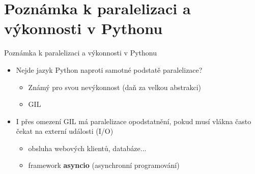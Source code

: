 \documentclass{beamer}
\begin{document}
\section{Poznámka k paralelizaci a výkonnosti v Pythonu}
\begin{frame}{Poznámka k paralelizaci a výkonnosti v Pythonu}
	\begin{itemize}
    \item Nejde jazyk Python naproti samotné podstatě paralelizace?
    \begin{itemize}
      \item [\textendash] Známý pro svou nevýkonnost (daň za velkou abstrakci)      
      \item [\textendash] GIL
    \end{itemize}

    \item I přes omezení GIL má paralelizace opodstatnění, pokud musí vlákna často čekat na externí události (I/O)
    \begin{itemize}
      \item [\textendash] obsluha webových klientů, databáze...
      \item [\textendash] framework \textbf{asyncio} (asynchronní programování)
    \end{itemize}
  \end{itemize}
\end{frame}
\end{document}

